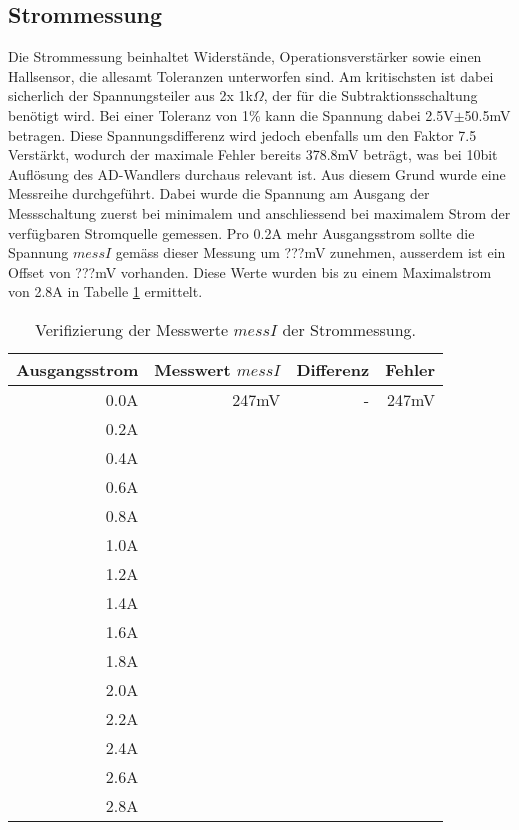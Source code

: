 \subsection{Strommessung}\label{subsec_messi}
Die Strommessung beinhaltet Widerstände, Operationsverstärker sowie einen Hallsensor, die allesamt Toleranzen unterworfen sind. Am kritischsten ist dabei sicherlich der Spannungsteiler aus 2x 1k$\Omega$, der für die Subtraktionsschaltung benötigt wird. Bei einer Toleranz von 1\% kann die Spannung dabei 2.5V$\pm$50.5mV betragen. Diese Spannungsdifferenz wird jedoch ebenfalls um den Faktor 7.5 Verstärkt, wodurch der maximale Fehler bereits 378.8mV beträgt, was bei 10bit Auflösung des AD-Wandlers durchaus relevant ist. \newline
Aus diesem Grund wurde eine Messreihe durchgeführt. Dabei wurde die Spannung am Ausgang der Messschaltung zuerst bei minimalem und anschliessend bei maximalem Strom der verfügbaren Stromquelle gemessen. Pro 0.2A mehr Ausgangsstrom sollte die Spannung $messI$ gemäss dieser Messung um ???mV zunehmen, ausserdem ist ein Offset von ???mV vorhanden. Diese Werte wurden bis zu einem Maximalstrom von 2.8A in Tabelle \ref{tab:messI} ermittelt.
\begin{table}%
\centering
\begin{tabular}{|r|r|r|r|}
	\hline
	\textbf{Ausgangsstrom} & \textbf{Messwert $messI$} & \textbf{Differenz} & \textbf{Fehler} \\ \hline
	0.0A & 247mV & - & 247mV \\ \hline
	0.2A & & & \\ \hline
	0.4A & & & \\ \hline
	0.6A & & & \\ \hline
	0.8A & & & \\ \hline
	1.0A & & & \\ \hline
	1.2A & & & \\ \hline
	1.4A & & & \\ \hline
	1.6A & & & \\ \hline
	1.8A & & & \\ \hline
	2.0A & & & \\ \hline
	2.2A & & & \\ \hline
	2.4A & & & \\ \hline
	2.6A & & & \\ \hline
	2.8A & & & \\ \hline
\end{tabular}
\caption{Verifizierung der Messwerte $messI$ der Strommessung.}
\label{tab:messI}
\end{table}
